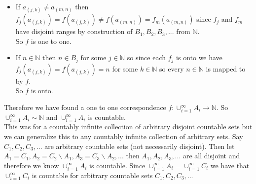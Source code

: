 \documentclass{article}
\begin{document}
\begin{center}
    \begin{itemize}
        \item If $a_{(j,k)}\neq a_{(m,n)}$ then $f_j(a_{(j,k)}) = f(a_{(j,k)})\neq f(a_{(m,n)}) = f_m(a_{(m,n)})$ since $f_j$ and $f_m$ have disjoint ranges by construction of $B_1, B_2, B_3, ...$ from $\mathbb{N}$.
        \\So $f$ is one to one.
        \item If $n\in\mathbb{N}$ then $n\in B_j$ for some $j\in\mathbb{N}$ so since each $f_j$ is onto we have $f_j(a_{(j,k)}) = f(a_{(j,k)}) = n$ for some $k\in\mathbb{N}$ so every $n\in\mathbb{N}$ is mapped to by $f$. 
        \\So $f$ is onto.
    \end{itemize}
    Therefore we have found a one to one correspondence $f:\cup _{i=1}^{\infty} A_i\rightarrow\mathbb{N}$. So $\cup _{i=1}^{\infty} A_i\sim\mathbb{N}$ and $\cup _{i=1}^{\infty} A_i$ is countable.
    \\This was for a countably infinite collection of arbitrary disjoint countable sets but we can generalize this to any countably infinite collection of arbitrary sets. Say $C_1, C_2, C_3, ...$ are arbitrary countable sets (not necessarily disjoint). Then let $A_1 = C_1, A_2 = C_2\backslash A_1, A_3 = C_3\backslash A_2, ...$ then $A_1, A_2, A_3, ...$ are all disjoint and therefore we know $\cup _{i=1}^{\infty} A_i$ is countable. Since $\cup _{i=1}^{\infty} A_i = \cup _{i=1}^{\infty} C_i$ we have that $\cup _{i=1}^{\infty} C_i$ is countable for arbitrary countable sets $C_1, C_2, C_3, ...$ \qedsymbol
\end{center}


\newpage
\end{document}
